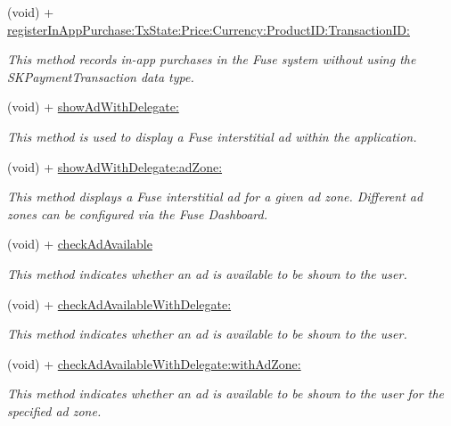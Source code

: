 \begin{DoxyCompactItemize}
(void) + \hyperlink{interface_fuse_a_p_i_a2115a4fac03204fd73699ab9ea3314f5}{register\+In\+App\+Purchase\+:\+Tx\+State\+:\+Price\+:\+Currency\+:\+Product\+I\+D\+:\+Transaction\+I\+D\+:}
\begin{DoxyCompactList}\small\item\em This method records in-\/app purchases in the Fuse system without using the S\+K\+Payment\+Transaction data type. \end{DoxyCompactList}\item 
(void) + \hyperlink{interface_fuse_a_p_i_ada82ae54afd63865982e516d4a71a8b5}{show\+Ad\+With\+Delegate\+:}
\begin{DoxyCompactList}\small\item\em This method is used to display a Fuse interstitial ad within the application. \end{DoxyCompactList}\item 
(void) + \hyperlink{interface_fuse_a_p_i_a77f8d91d1491f0ad94bc1f0ca3fb7993}{show\+Ad\+With\+Delegate\+:ad\+Zone\+:}
\begin{DoxyCompactList}\small\item\em This method displays a Fuse interstitial ad for a given ad zone. Different ad zones can be configured via the Fuse Dashboard. \end{DoxyCompactList}\item 
(void) + \hyperlink{interface_fuse_a_p_i_a5813b52f07d4818a4e97ceb9829a0786}{check\+Ad\+Available}
\begin{DoxyCompactList}\small\item\em This method indicates whether an ad is available to be shown to the user. \end{DoxyCompactList}\item 
(void) + \hyperlink{interface_fuse_a_p_i_a3c9bb1034fabe54bb67b21503cf74311}{check\+Ad\+Available\+With\+Delegate\+:}
\begin{DoxyCompactList}\small\item\em This method indicates whether an ad is available to be shown to the user. \end{DoxyCompactList}\item 
(void) + \hyperlink{interface_fuse_a_p_i_a12f119c6dd8ea610f5f2a376a0c6f7a5}{check\+Ad\+Available\+With\+Delegate\+:with\+Ad\+Zone\+:}
\begin{DoxyCompactList}\small\item\em This method indicates whether an ad is available to be shown to the user for the specified ad zone. \end{DoxyCompactList}\item 

\end{DoxyCompactItemize}
